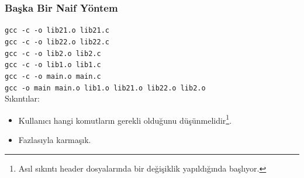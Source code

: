 \documentclass{beamer}
\begin{document}
\begin{frame}
    \frametitle{Başka Bir Naif Yöntem}
    \texttt{gcc -c -o lib21.o lib21.c\\
    gcc -c -o lib22.o lib22.c\\
    gcc -c -o lib2.o lib2.c\\
    gcc -c -o lib1.o lib1.c\\
    gcc -c -o main.o main.c\\
    gcc -o main main.o lib1.o lib21.o lib22.o lib2.o}\\
    \vspace{4mm}
    Sıkıntılar:
    \begin{itemize}
        \item Kullanıcı hangi komutların gerekli olduğunu düşünmelidir\footnote{Asıl sıkıntı header dosyalarında bir değişiklik yapıldığında başlıyor.}.
            \item Fazlasıyla karmaşık.
    \end{itemize}
\end{frame}
{
\begin{frame}

    
\end{frame}
}
\end{document}
